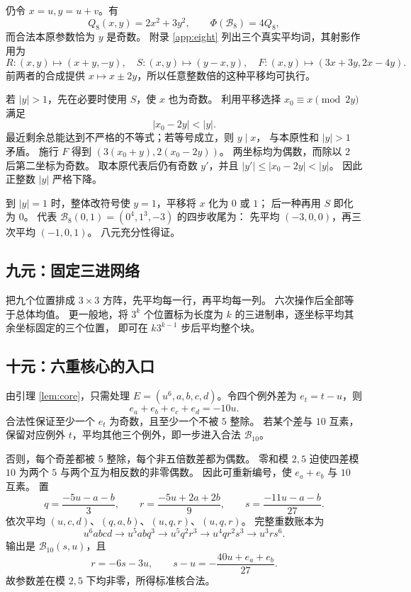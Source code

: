 \documentclass[UTF8,fontset=fandol,zihao=-4,a4paper]{ctexart}
\numberwithin{equation}{section}
\theoremstyle{definition}
\newcommand{\B}{\mathcal B}
\begin{document}
仍令 $x=u,y=u+v$。有
\[
 Q_8(x,y)=2x^2+3y^2,\qquad \Phi(\B_8)=4Q_8,
\]
而合法本原参数恰为 $y$ 是奇数。
附录 \ref{app:eight} 列出三个真实平均词，其射影作用为
\begin{equation}\label{eq:eight-macros}
 R:(x,y)\mapsto(x+y,-y),\quad
 S:(x,y)\mapsto(y-x,y),\quad
 F:(x,y)\mapsto(3x+3y,2x-4y).
\end{equation}
前两者的合成提供 $x\mapsto x\pm2y$，所以任意整数倍的这种平移均可执行。

若 $|y|>1$，先在必要时使用 $S$，使 $x$ 也为奇数。
利用平移选择 $x_0\equiv x\pmod{2y}$ 满足
\[
 |x_0-2y|<|y|.
\]
最近剩余总能达到不严格的不等式；若等号成立，则 $y\mid x$，
与本原性和 $|y|>1$ 矛盾。
施行 $F$ 得到 $(3(x_0+y),2(x_0-2y))$。
两坐标均为偶数，而除以 $2$ 后第二坐标为奇数。
取本原代表后仍有奇数 $y'$，并且 $|y'|\le|x_0-2y|<|y|$。
因此正整数 $|y|$ 严格下降。

到 $|y|=1$ 时，整体改符号使 $y=1$，平移将 $x$ 化为 $0$ 或 $1$；
后一种再用 $S$ 即化为 $0$。
代表 $\B_8(0,1)=(0^4,1^3,-3)$ 的四步收尾为：
先平均 $(-3,0,0)$，再三次平均 $(-1,0,1)$。
八元充分性得证。

\subsection{九元：固定三进网络}\label{subsec:nine}

把九个位置排成 $3\times3$ 方阵，先平均每一行，再平均每一列。
六次操作后全部等于总体均值。
更一般地，将 $3^k$ 个位置标为长度为 $k$ 的三进制串，逐坐标平均其余坐标固定的三个位置，
即可在 $k3^{k-1}$ 步后平均整个块。

\subsection{十元：六重核心的入口}\label{subsec:ten-bridge}

由引理 \ref{lem:core}，只需处理
$E=(u^6,a,b,c,d)$。令四个例外差为 $e_t=t-u$，则
\[
 e_a+e_b+e_c+e_d=-10u.
\]
合法性保证至少一个 $e_t$ 为奇数，且至少一个不被 $5$ 整除。
若某个差与 $10$ 互素，保留对应例外 $t$，平均其他三个例外，即一步进入合法 $\B_{10}$。

否则，每个奇差都被 $5$ 整除，每个非五倍数差都为偶数。
零和模 $2,5$ 迫使四差模 $10$ 为两个 $5$ 与两个互为相反数的非零偶数。
因此可重新编号，使 $e_a+e_b$ 与 $10$ 互素。
置
\[
 q=\frac{-5u-a-b}{3},\qquad
 r=\frac{-5u+2a+2b}{9},\qquad
 s=\frac{-11u-a-b}{27}.
\]
依次平均 $(u,c,d)$、$(q,a,b)$、$(u,q,r)$、$(u,q,r)$。
完整重数账本为
\[
 u^6abcd\longrightarrow u^5abq^3\longrightarrow u^5q^2r^3
 \longrightarrow u^4qr^2s^3\longrightarrow u^3rs^6.
\]
输出是 $\B_{10}(s,u)$，且
\[
 r=-6s-3u,\qquad s-u=-\frac{40u+e_a+e_b}{27}.
\]
故参数差在模 $2,5$ 下均非零，所得标准核合法。
\end{document}
